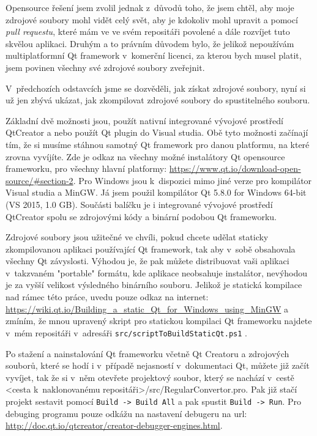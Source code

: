 Opensource řešení jsem zvolil jednak z~důvodů toho, že jsem chtěl, aby moje zdrojové soubory mohl vidět celý svět, aby je kdokoliv mohl upravit a pomocí \textit{pull requestu}, které mám ve ve svém repositáři povolené a dále rozvíjet tuto skvělou aplikaci. Druhým a to právním důvodem bylo, že jelikož nepoužívám multiplatformní Qt framework v~komerční licenci, za kterou bych musel platit, jsem povinen všechny své zdrojové soubory zveřejnit.

V~předchozích odstavcích jsme se dozvěděli, jak získat zdrojové soubory, nyní si už jen zbývá ukázat, jak zkompilovat zdrojové soubory do spustitelného souboru. 

Základní dvě možnosti jsou, použít nativní integrované vývojové prostředí QtCreator a nebo použít Qt plugin do Visual studia. Obě tyto možnosti začínají tím, že si musíme stáhnou samotný Qt framework pro danou platformu, na které zrovna vyvíjíte. Zde je odkaz na všechny možné instalátory Qt opensource frameworku, pro všechny hlavní platformy: \url{https://www.qt.io/download-open-source/#section-2}. Pro Windows jsou k~dispozici mimo jiné verze pro kompilátor Visual studia a MinGW. Já jsem použil kompilátor Qt 5.8.0 for Windows 64-bit (VS 2015, 1.0 GB). Součásti balíčku je i integrované vývojové prostředí QtCreator spolu se zdrojovými kódy a binární podobou Qt frameworku. 

Zdrojové soubory jsou užitečné ve chvíli, pokud chcete udělat staticky zkompilovanou aplikaci používající Qt framework, tak aby v~sobě obsahovala všechny Qt závyslosti. Výhodou je, že pak můžete distribuovat vaši aplikaci v~takzvaném "portable" formátu, kde aplikace neobsahuje instalátor, nevýhodou je za vyšší velikost výsledného binárního souboru. Jelikož je statická kompilace nad rámec této práce, uvedu pouze odkaz na internet: \url{https://wiki.qt.io/Building_a_static_Qt_for_Windows_using_MinGW} a zmíním, že mnou upravený skript pro statickou kompilaci Qt frameworku najdete v~mém repositáři v~adresáři \texttt{src/scriptToBuildStaticQt.ps1} .

Po stažení a nainstalování Qt frameworku včetně Qt Creatoru a zdrojových souborů, které se hodí i v~případě nejasností v~dokumentaci Qt, můžete již začít vyvíjet, tak že si v~něm otevřete projektový soubor, který se nachází v~cestě <cesta k~naklonovanému repositáři>/src/RegularConvertor.pro. Pak již stačí projekt sestavit pomocí \texttt{Build -> Build All} a pak spustit \texttt{Build -> Run}. Pro debuging programu pouze odkážu na nastavení debugeru na url: \url{http://doc.qt.io/qtcreator/creator-debugger-engines.html}.   

